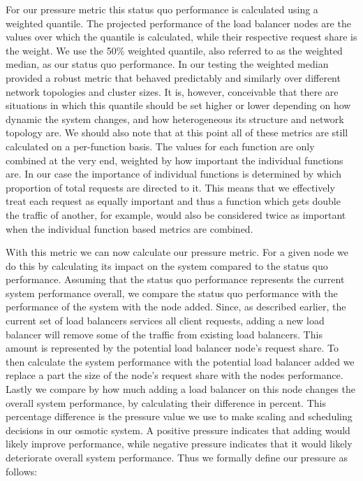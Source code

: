 For our pressure metric this status quo performance is calculated using a weighted quantile.
The projected performance of the load balancer nodes are the values over which the quantile is calculated, while their respective request share is the weight.
We use the 50\% weighted quantile, also referred to as the weighted median, as our status quo performance.
In our testing the weighted median provided a robust metric that behaved predictably and similarly over different network topologies and cluster sizes.
It is, however, conceivable that there are situations in which this quantile should be set higher or lower depending on how dynamic the system changes, and how heterogeneous its structure and network topology are.
We should also note that at this point all of these metrics are still calculated on a per-function basis.
The values for each function are only combined at the very end, weighted by how important the individual functions are.
In our case the importance of individual functions is determined by which proportion of total requests are directed to it.
This means that we effectively treat each request as equally important and thus a function which gets double the traffic of another, for example, would also be considered twice as important when the individual function based metrics are combined.

With this metric we can now calculate our pressure metric. For a given node we do this by calculating its impact on the system compared to the status quo performance.
Assuming that the status quo performance represents the current system performance overall, we compare the status quo performance with the performance of the system with the node added.
Since, as described earlier, the current set of load balancers services all client requests, adding a new load balancer will remove some of the traffic from existing load balancers.
This amount is represented by the potential load balancer node's request share.
To then calculate the system performance with the potential load balancer added we replace a part the size of the node's request share with the nodes performance.
Lastly we compare by how much adding a load balancer on this node changes the overall system performance, by calculating their difference in percent.
This percentage difference is the pressure value we use to make scaling and scheduling decisions in our osmotic system.
A positive pressure indicates that adding would likely improve performance, while negative pressure indicates that it would likely deteriorate overall system performance.
Thus we formally define our pressure as follows:

